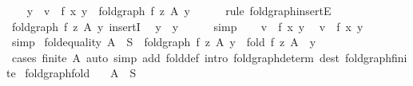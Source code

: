 \begin{isabellebody}
\ \ \isamarkupfalse%
\ y{\isacharprime}{\kern0pt}\ \ {\isachardoublequoteopen}v\ {\isacharequal}{\kern0pt}\ f\ x\ y{\isacharprime}{\kern0pt}{\isachardoublequoteclose}\ \ {\isachardoublequoteopen}fold{\isacharunderscore}{\kern0pt}graph\ f\ z\ A\ y{\isacharprime}{\kern0pt}{\isachardoublequoteclose}\isanewline
\ \ \ \ \isamarkupfalse%
\ {\isacharparenleft}{\kern0pt}rule\ fold{\isacharunderscore}{\kern0pt}graph{\isacharunderscore}{\kern0pt}insertE{\isacharparenright}{\kern0pt}\isanewline
\ \ \isamarkupfalse%
\ {\isacartoucheopen}fold{\isacharunderscore}{\kern0pt}graph\ f\ z\ A\ y{\isacharprime}{\kern0pt}{\isacartoucheclose}\ insertI\ \isamarkupfalse%
\ {\isachardoublequoteopen}y{\isacharprime}{\kern0pt}\ {\isacharequal}{\kern0pt}\ y{\isachardoublequoteclose}\isanewline
\ \ \ \ \isamarkupfalse%
\ simp\isanewline
\ \ \isamarkupfalse%
\ {\isacartoucheopen}v\ {\isacharequal}{\kern0pt}\ f\ x\ y{\isacharprime}{\kern0pt}{\isacartoucheclose}\ \isamarkupfalse%
\ {\isachardoublequoteopen}v\ {\isacharequal}{\kern0pt}\ f\ x\ y{\isachardoublequoteclose}\isanewline
\ \ \ \ \isamarkupfalse%
\ simp\isanewline
{}\isamarkupfalse%
%
\endisatagproof
{\isafoldproof}%
%
\isadelimproof
\isanewline
%
\endisadelimproof
\isanewline
{}\isamarkupfalse%
\ fold{\isacharunderscore}{\kern0pt}equality{\isacharcolon}{\kern0pt}\ {\isachardoublequoteopen}A\ {\isasymsubseteq}\ S\ {\isasymLongrightarrow}\ fold{\isacharunderscore}{\kern0pt}graph\ f\ z\ A\ y\ {\isasymLongrightarrow}\ fold\ f\ z\ A\ {\isacharequal}{\kern0pt}\ y{\isachardoublequoteclose}\isanewline
%
\isadelimproof
\ \ %
\endisadelimproof
%
\isatagproof
{}\isamarkupfalse%
\ {\isacharparenleft}{\kern0pt}cases\ {\isachardoublequoteopen}finite\ A{\isachardoublequoteclose}{\isacharparenright}{\kern0pt}\ {\isacharparenleft}{\kern0pt}auto\ simp\ add{\isacharcolon}{\kern0pt}\ fold{\isacharunderscore}{\kern0pt}def\ intro{\isacharcolon}{\kern0pt}\ fold{\isacharunderscore}{\kern0pt}graph{\isacharunderscore}{\kern0pt}determ\ dest{\isacharcolon}{\kern0pt}\ fold{\isacharunderscore}{\kern0pt}graph{\isacharunderscore}{\kern0pt}finite{\isacharparenright}{\kern0pt}%
\endisatagproof
{\isafoldproof}%
%
\isadelimproof
\isanewline
%
\endisadelimproof
\isanewline
{}\isamarkupfalse%
\ fold{\isacharunderscore}{\kern0pt}graph{\isacharunderscore}{\kern0pt}fold{\isacharcolon}{\kern0pt}\isanewline
\ \ \ {\isachardoublequoteopen}A\ {\isasymsubseteq}\ S{\isachardoublequoteclose}\isanewline

\end{isabellebody}
